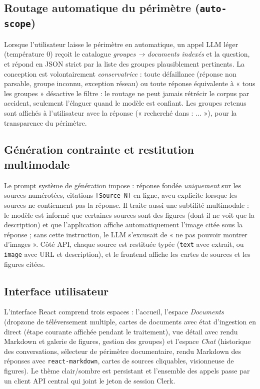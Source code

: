 \subsection{Routage automatique du périmètre (\texttt{auto-scope})}

Lorsque l'utilisateur laisse le périmètre en automatique, un appel LLM léger
(température 0) reçoit le catalogue \emph{groupes → documents indexés} et la question, et
répond en JSON strict par la liste des groupes plausiblement pertinents. La conception est
volontairement \emph{conservatrice} : toute défaillance (réponse non parsable, groupe
inconnu, exception réseau) ou toute réponse équivalente à « tous les groupes » désactive
le filtre : le routage ne peut jamais rétrécir le corpus par accident, seulement l'élaguer
quand le modèle est confiant. Les groupes retenus sont affichés à l'utilisateur avec la
réponse (« recherché dans : ... »), pour la transparence du périmètre.

\subsection{Génération contrainte et restitution multimodale}

Le prompt système de génération impose : réponse fondée \emph{uniquement} sur les sources
numérotées, citations \texttt{[Source N]} en ligne, aveu explicite lorsque les sources ne
contiennent pas la réponse. Il traite aussi une subtilité multimodale : le modèle est
informé que certaines sources sont des figures (dont il ne voit que la description) et que
l'application affiche automatiquement l'image citée sous la réponse ; sans cette
instruction, le LLM s'excusait de « ne pas pouvoir montrer d'images ». Côté API, chaque
source est restituée typée (\texttt{text} avec extrait, ou \texttt{image} avec URL et
description), et le frontend affiche les cartes de sources et les figures citées.

\subsection{Interface utilisateur}

L'interface React comprend trois espaces : l'accueil, l'espace \emph{Documents} (dropzone
de téléversement multiple, cartes de documents avec état d'ingestion en direct (étape
courante affichée pendant le traitement), vue détail avec rendu Markdown et galerie de
figures, gestion des groupes) et l'espace \emph{Chat} (historique des conversations,
sélecteur de périmètre documentaire, rendu Markdown des réponses avec
\texttt{react-markdown}, cartes de sources cliquables, visionneuse de figures). Le thème
clair/sombre est persistant et l'ensemble des appels passe par un client API central qui
joint le jeton de session Clerk.

